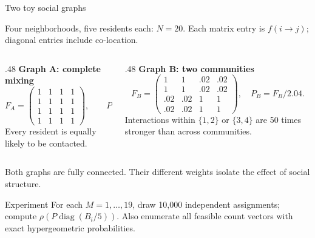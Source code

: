 \documentclass[aspectratio=169,10pt]{beamer}
\begin{document}
\begin{frame}{Two toy social graphs}
\small

Four neighborhoods, five residents each: $N=20$. Each matrix entry is $f(i\to j)$; diagonal entries include co-location.
\begin{columns}[T]
\begin{column}{.48\textwidth}
\textbf{Graph A: complete mixing}
\[
 F_A=\begin{pmatrix}1&1&1&1\\1&1&1&1\\1&1&1&1\\1&1&1&1\end{pmatrix},\qquad P_A=F_A/4.
\]
Every resident is equally likely to be contacted.
\end{column}
\begin{column}{.48\textwidth}
\textbf{Graph B: two communities}
\[
 F_B=\begin{pmatrix}1&1&.02&.02\\1&1&.02&.02\\.02&.02&1&1\\.02&.02&1&1\end{pmatrix},\quad P_B=F_B/2.04.
\]
Interactions within $\{1,2\}$ or $\{3,4\}$ are 50 times stronger than across communities.
\end{column}
\end{columns}
\medskip
Both graphs are fully connected. Their different weights isolate the effect of social structure.
\begin{block}{Experiment}
For each $M=1,\ldots,19$, draw 10,000 independent assignments; compute $\rho(P\operatorname{diag}(B_i/5))$. Also enumerate all feasible count vectors with exact hypergeometric probabilities.
\end{block}

\end{frame}
\end{document}
